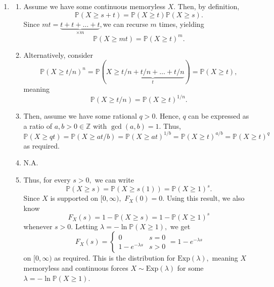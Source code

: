 \documentclass[12pt]{article}
\begin{document}
\begin{enumerate}
\begin{enumerate}
        Hence, this is equal to
        $$
        \dfrac{1 - F_X(s + t)}{1 - F_X(s)}  = \dfrac{e^{-\lambda(s +
        t)}}{e^{-\lambda(s)}} = e^{-\lambda t} = 1- (1 - e^{-\lambda
        t}) = \mathbb P(X \geq t)
        $$
        as required. \qed

      \item
        \begin{enumerate}
          \item Assume we have some continuous memoryless $X.$ Then,
            by definition, $$
            \mathbb P(X \geq s + t) = \mathbb P(X \geq t) \mathbb P(X \geq s).
            $$
            Since $mt = \underbrace{t + t + \ldots + t}_{\times
            m},$we can recurse $m$ times, yielding
            $$
            \mathbb P(X \geq mt) = \mathbb P(X \geq t)^{m}.
            $$

          \item Alternatively, consider $$
            \mathbb P(X \geq t/n)^{n} = \mathbb P(X \geq
            \underbrace{t/n + t/n + \ldots + t/n}_{t}) = \mathbb P(X \geq t),
            $$
            meaning
            $$
            \mathbb P(X \geq t/ n) = \mathbb P(X \geq t)^{1/n}.
            $$

          \item Then, assume we have some rational $q > 0.$ Hence,
            $q$ can be expressed as a ratio of $a, b > 0 \in \mathbb
            Z$ with $\gcd(a, b) = 1$. Thus,
            $$
            \mathbb P(X \geq qt) = \mathbb P(X \geq at/b) = \mathbb
            P(X \geq at)^{1/b} = \mathbb P(X \geq t)^{a/b} = \mathbb
            P(X \geq t)^{q}
            $$
            as required.

          \item N.A.

          \item Thus, for every $s > 0,$ we can write
            $$
            \mathbb P(X \geq s) = \mathbb P(X \geq s(1)) = \mathbb
            P(X \geq 1)^{s}.
            $$
            Since $X$ is supported on $[0, \infty),$ $F_X(0) = 0.$
            Using this result, we also know
            $$
            F_X(s) = 1- \mathbb P(X \geq s) = 1 - \mathbb P(X \geq 1)^{s}
            $$
            whenever $s > 0.$ Letting $\lambda = -\ln \mathbb P(X
            \geq 1),$ we get
            $$
            F_X(s) =
            \begin{cases}
              0 & s = 0 \\
              1 - e^{-\lambda s} & s > 0
            \end{cases} = 1-e^{-\lambda s}
            $$
            on $[0, \infty)$ as required. This is the distribution
            for $\text{Exp}(\lambda),$ meaning $X$ memoryless and
            continuous forces $X \sim \text{Exp}(\lambda)$ for some
            $\lambda = - \ln \mathbb P(X \geq 1).$
        \end{enumerate}
    \end{enumerate}


\end{enumerate}
\end{document}
